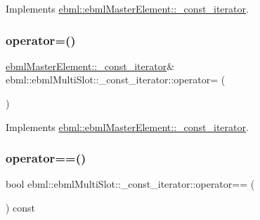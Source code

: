 Implements \mbox{\hyperlink{classebml_1_1ebmlMasterElement_1_1__const__iterator_a439f540325443a3c3a3acdcd8df81553}{ebml\+::ebml\+Master\+Element\+::\+\_\+const\+\_\+iterator}}.

\mbox{\label{classebml_1_1ebmlMultiSlot_1_1__const__iterator_a6e2de45285786f1045fef8be51974b0b}} 
\subsubsection{\texorpdfstring{operator=()}{operator=()}}
{\footnotesize\ttfamily \mbox{\hyperlink{classebml_1_1ebmlMasterElement_1_1__const__iterator}{ebml\+Master\+Element\+::\+\_\+const\+\_\+iterator}}\& ebml\+::ebml\+Multi\+Slot\+::\+\_\+const\+\_\+iterator\+::operator= (\begin{DoxyParamCaption}\item[{const \mbox{\hyperlink{classebml_1_1ebmlMasterElement_1_1__const__iterator}{ebml\+Master\+Element\+::\+\_\+const\+\_\+iterator}} \&}]{ }\end{DoxyParamCaption})\hspace{0.3cm}{\ttfamily [virtual]}}



Implements \mbox{\hyperlink{classebml_1_1ebmlMasterElement_1_1__const__iterator_a102cf8b36c0d8184680ef15594bb59fb}{ebml\+::ebml\+Master\+Element\+::\+\_\+const\+\_\+iterator}}.

\mbox{\label{classebml_1_1ebmlMultiSlot_1_1__const__iterator_a874e71d4f6d86e1213c8381ec20f3069}} 
\subsubsection{\texorpdfstring{operator==()}{operator==()}}
{\footnotesize\ttfamily bool ebml\+::ebml\+Multi\+Slot\+::\+\_\+const\+\_\+iterator\+::operator== (\begin{DoxyParamCaption}\item[{const \mbox{\hyperlink{classebml_1_1ebmlMasterElement_1_1__const__iterator}{ebml\+Master\+Element\+::\+\_\+const\+\_\+iterator}} \&}]{ }\end{DoxyParamCaption}) const\hspace{0.3cm}{\ttfamily [virtual]}}



